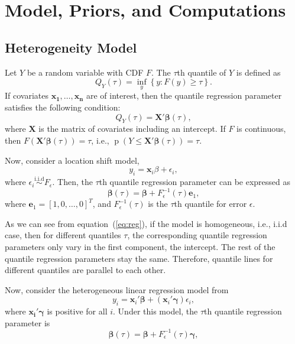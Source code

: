 \documentclass[12pt]{article}
\DeclareMathOperator{\pr}{p}
\begin{document}
\section{Model, Priors, and Computations}
\label{sec:model}
\subsection{Heterogeneity Model}
Let $Y$ be a random variable with CDF $F$.  The $\tau$th quantile of
$Y$ is defined as
\begin{displaymath}
  Q_Y(\tau) = \underset{y}{\inf} \left\{ y: F(y) \ge \tau \right\}.
\end{displaymath}
If covariates $\bm{x_1, \ldots, x_n}$ are of interest, then the
quantile regression parameter satisfies the following condition:
\begin{displaymath}
  Q_Y(\tau) = \bm{X'\beta}(\tau),
\end{displaymath}
where $\bm{X}$ is the matrix of covariates including an intercept.  If
$F$ is continuous, then $F(\bm{X'\beta}(\tau)) = \tau$, i.e., $\pr(Y
\le \bm{X'\beta}(\tau)) = \tau$.

Now, consider a location shift model,
\begin{displaymath}
  y_i = \bm{x}_i\beta + \epsilon_i,
\end{displaymath}
where $\epsilon_i \stackrel{\mbox{i.i.d}}{\sim} F_{\epsilon}$. Then,
the $\tau$th quantile regression parameter can be expressed as
\begin{equation} \label{eq:reg} \bm{\beta}(\tau) = \bm{\beta} +
  F^{-1}_{\epsilon}(\tau) \bm{e}_1,
\end{equation}
where $\bm{e}_1 = [1, 0, \ldots, 0]^T$, and $F^{-1}_{\epsilon}(\tau)$
is the $\tau$th quantile for error $\epsilon$.

As we can see from equation~(\ref{eq:reg}), if the model is
homogeneous, i.e., i.i.d case, then for different quantiles $\tau$,
the corresponding quantile regression parameters only vary in the
first component, the intercept. The rest of the quantile regression
parameters stay the same. Therefore, quantile lines for different
quantiles are parallel to each other.

Now, consider the heterogeneous linear regression model from
\citet{he1998}
\begin{equation}\label{eq:he}
  y_i = \bm{x}_i'\bm{\beta} + (\bm{x}_i'\bm{\gamma}) \epsilon_i,
\end{equation}
where $\bm{x_i'\gamma}$ is positive for all $i$. Under this model, the
$\tau$th quantile regression parameter is
\begin{equation}\label{eq:quan}
  \bm{\beta}(\tau) = \bm{\beta} + F^{-1}_{\epsilon}(\tau) \bm{\gamma},
\end{equation}
\end{document}
